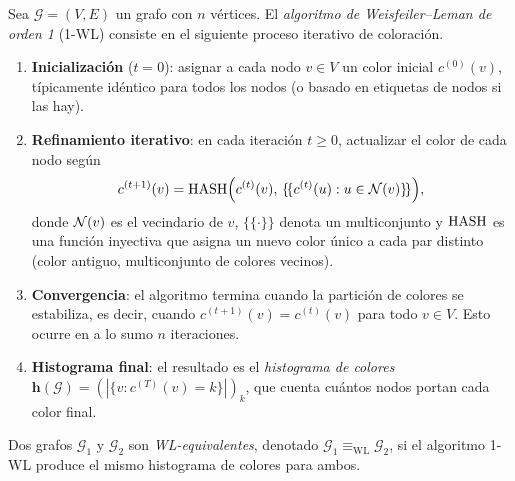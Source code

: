 \begin{definition}
\label{def:priors:wl}
Sea $\mathcal{G} = (V, E)$ un grafo con $n$ v\'ertices. El \emph{algoritmo de
Weisfeiler--Leman de orden 1} (1-WL) consiste en el siguiente proceso iterativo
de coloraci\'on.
\begin{enumerate}
\item \textbf{Inicializaci\'on} ($t = 0$): asignar a cada nodo $v \in V$ un color
inicial $c^{(0)}(v)$, t\'ipicamente id\'entico para todos los nodos (o basado en
etiquetas de nodos si las hay).
\item \textbf{Refinamiento iterativo}: en cada iteraci\'on $t \ge 0$, actualizar
el color de cada nodo seg\'un
\[
  c^{(t+1)}(v) = \operatorname{HASH}\Bigl(c^{(t)}(v),\,
      \{\!\{ c^{(t)}(u) : u \in \mathcal{N}(v) \}\!\}\Bigr),
\]
donde $\mathcal{N}(v)$ es el vecindario de $v$, $\{\!\{\cdot\}\!\}$ denota un
multiconjunto y $\operatorname{HASH}$ es una funci\'on inyectiva que asigna un nuevo color
\'unico a cada par distinto (color antiguo, multiconjunto de colores vecinos).
\item \textbf{Convergencia}: el algoritmo termina cuando la partici\'on de colores
se estabiliza, es decir, cuando $c^{(t+1)}(v) = c^{(t)}(v)$ para todo $v \in V$.
Esto ocurre en a lo sumo $n$ iteraciones.
\item \textbf{Histograma final}: el resultado es el \emph{histograma de colores}
$\mathbf{h}(\mathcal{G}) = (|\{v : c^{(T)}(v) = k\}|)_k$, que cuenta cu\'antos
nodos portan cada color final.
\end{enumerate}
\end{definition}

\begin{definition}[WL-equivalencia]
\label{def:priors:wl-equivalence}
Dos grafos $\mathcal{G}_1$ y $\mathcal{G}_2$ son \emph{WL-equivalentes}, denotado
$\mathcal{G}_1 \equiv_{\mathrm{WL}} \mathcal{G}_2$, si el algoritmo 1-WL produce
el mismo histograma de colores para ambos.
\end{definition}

